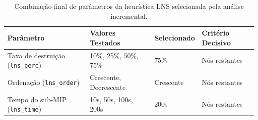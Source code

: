 \begin{table}[htbp]
\centering
\caption{Combinação final de parâmetros da heurística LNS selecionada pela análise incremental.}
\label{tab:config_final}
\small
\begin{tabular}{@{}llll@{}}
\toprule
\textbf{Parâmetro} & \textbf{Valores Testados} & \textbf{Selecionado} & \textbf{Critério Decisivo} \\
\midrule
Taxa de destruição (\texttt{lns\_perc}) & 10\%, 25\%, 50\%, 75\% & 75\% & Nós restantes \\
Ordenação (\texttt{lns\_order})         & Crescente, Decrescente  & Crescente & Nós restantes \\
Tempo do sub-MIP (\texttt{lns\_time})   & 10s, 50s, 100s, 200s   & 200s & Nós restantes \\
\bottomrule
\end{tabular}
\end{table}
